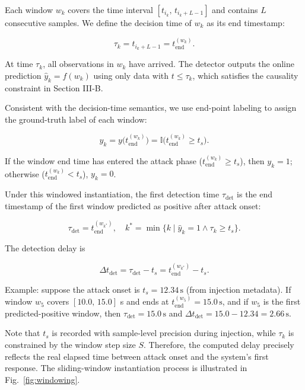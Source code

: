 \documentclass{ieeeaccess}
\begin{document}
Each window $w_k$ covers the time interval $[t_{i_k},\,t_{i_k+L-1}]$ and contains $L$ consecutive samples. We define the decision time of $w_k$ as its end timestamp:

\begin{equation}
\tau_k = t_{i_k+L-1} = t_{\mathrm{end}}^{(w_k)}.
\end{equation}

At time $\tau_k$, all observations in $w_k$ have arrived. The detector outputs the online prediction $\hat{y}_k=f(w_k)$ using only data with $t\le \tau_k$, which satisfies the causality constraint in Section III-B.

Consistent with the decision-time semantics, we use end-point labeling to assign the ground-truth label of each window:

\begin{equation}
y_k = y\bigl(t_{\mathrm{end}}^{(w_k)}\bigr)=\mathbb{I}\bigl(t_{\mathrm{end}}^{(w_k)}\ge t_s\bigr).
\end{equation}

If the window end time has entered the attack phase ($t_{\mathrm{end}}^{(w_k)}\ge t_s$), then $y_k=1$; otherwise ($t_{\mathrm{end}}^{(w_k)}<t_s$), $y_k=0$.

Under this windowed instantiation, the first detection time $\tau_{\mathrm{det}}$ is the end timestamp of the first window predicted as positive after attack onset:

\begin{equation}
\tau_{\mathrm{det}} = t_{\mathrm{end}}^{(w_{k^*})},\quad k^* = \min\{k\mid \hat{y}_k=1\wedge \tau_k\ge t_s\}.
\end{equation}

The detection delay is

\begin{equation}
\Delta t_{\mathrm{det}} = \tau_{\mathrm{det}}-t_s = t_{\mathrm{end}}^{(w_{k^*})}-t_s.
\end{equation}

Example: suppose the attack onset is $t_s=12.34\,\mathrm{s}$ (from injection metadata). If window $w_5$ covers $[10.0,\,15.0]$ s and ends at $t_{\mathrm{end}}^{(w_5)}=15.0\,\mathrm{s}$, and if $w_5$ is the first predicted-positive window, then $\tau_{\mathrm{det}}=15.0\,\mathrm{s}$ and $\Delta t_{\mathrm{det}}=15.0-12.34=2.66\,\mathrm{s}$.

Note that $t_s$ is recorded with sample-level precision during injection, while $\tau_k$ is constrained by the window step size $S$. Therefore, the computed delay precisely reflects the real elapsed time between attack onset and the system's first response. The sliding-window instantiation process is illustrated in Fig.~\ref{fig:windowing}.
\end{document}
